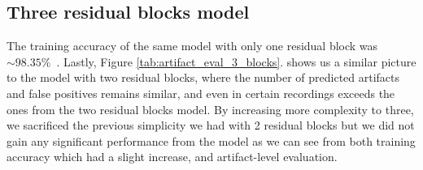 \documentclass[12pt,a4paper,titlepage,openany]{report}
\begin{document}
\begin{table}[htbp]
\centering
{}
\caption{Artifact-level evaluation of model predictions with two residual blocks}
\label{tab:artifact_eval_2_blocks}
\end{table}

\subsection{Three residual blocks model}

The training accuracy of the same model with only one residual block was \(\sim98.35\%\)~.
Lastly, Figure \ref{tab:artifact_eval_3_blocks}. shows us a similar picture to the model with two residual blocks, where the number of predicted artifacts and false positives remains similar, and even in certain recordings exceeds the ones from the two residual blocks model. By increasing more complexity to three, we sacrificed the previous simplicity we had with 2 residual blocks but we did not gain any significant performance from the model as we can see from both training accuracy which had a slight increase, and artifact-level evaluation. 
\end{document}
